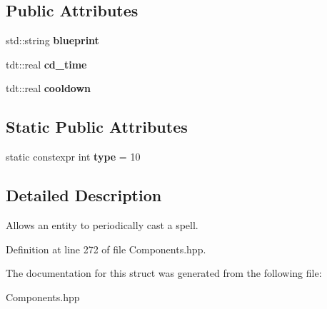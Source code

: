 \subsection*{Public Attributes}
\begin{DoxyCompactItemize}
\item 
std\+::string {\bfseries blueprint}\hypertarget{struct_spell_component_a7abaab12e30aeb0963b90a40e85d3e12}{}\label{struct_spell_component_a7abaab12e30aeb0963b90a40e85d3e12}

\item 
tdt\+::real {\bfseries cd\+\_\+time}\hypertarget{struct_spell_component_a408795d904893c26a19162827064edc2}{}\label{struct_spell_component_a408795d904893c26a19162827064edc2}

\item 
tdt\+::real {\bfseries cooldown}\hypertarget{struct_spell_component_a1d83c588bb504f78cf9f2ec9999651be}{}\label{struct_spell_component_a1d83c588bb504f78cf9f2ec9999651be}

\end{DoxyCompactItemize}
\subsection*{Static Public Attributes}
\begin{DoxyCompactItemize}
\item 
static constexpr int {\bfseries type} = 10\hypertarget{struct_spell_component_aeba2074e07a2694120db7e715b8129f9}{}\label{struct_spell_component_aeba2074e07a2694120db7e715b8129f9}

\end{DoxyCompactItemize}


\subsection{Detailed Description}
Allows an entity to periodically cast a spell. 

Definition at line 272 of file Components.\+hpp.



The documentation for this struct was generated from the following file\+:\begin{DoxyCompactItemize}
\item 
Components.\+hpp\end{DoxyCompactItemize}
